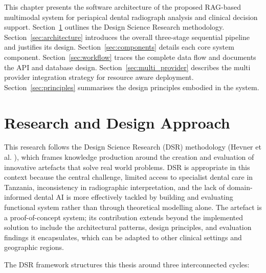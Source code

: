 \documentclass[12pt,a4paper]{report}
\begin{document}
	This chapter presents the software architecture of the proposed RAG-based multimodal system
	for periapical dental radiograph analysis and clinical decision support.
	Section~\ref{sec:dsr} outlines the Design Science Research methodology.
	Section~\ref{sec:architecture} introduces the overall three-stage sequential pipeline and
	justifies its design. Section~\ref{sec:components} details each core system component.
	Section~\ref{sec:workflow} traces the complete data flow and documents the API and database
	design. Section~\ref{sec:multi_provider} describes the multi provider integration strategy
	for resource aware deployment. Section~\ref{sec:principles} summarises the design
	principles embodied in the system.
	
	\section{Research and Design Approach}
	\label{sec:dsr}
	
	This research follows the Design Science Research (DSR) methodology (Hevner et al. \cite{Hevner2004}), which frames knowledge
	production around the creation and evaluation of innovative artefacts that solve real world
	problems. DSR is appropriate  in this context because the central challenge, limited access to specialist dental care in Tanzania, inconsistency in radiographic interpretation, and the lack of domain-informed dental AI is more effectively tackled by building and evaluating functional system rather than through theoretical modelling alone. The artefact is a proof-of-concept system; its contribution extends beyond the implemented solution to include the architectural patterns, design principles, and evaluation findings it encapsulates, which can be adapted to other clinical settings and geographic regions.
	
	The DSR framework structures this thesis around three interconnected cycles:
	
\end{document}
